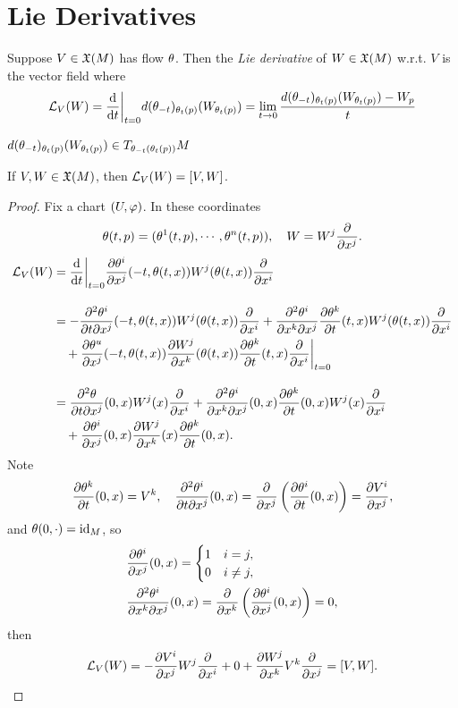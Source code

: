 \section{Lie Derivatives}
\begin{definition}
    Suppose $V \in \frak{X}(M)$ has flow $\theta$. Then the \textit{Lie derivative} of $W \in \frak{X}(M)$ w.r.t. $V$ is the vector field where 
    $$\mathcal{L}_V(W) = \dv{}{t}\bigg|_{t=0}d(\theta_{-t})_{\theta_t(p)}(W_{\theta_t(p)})
    = \lim_{t \to 0} \frac{d(\theta_{-t})_{\theta_t(p)}(W_{\theta_t(p)}) - W_p}{t}$$
\end{definition}
\begin{remark}
    $d(\theta_{-t})_{\theta_t(p)}(W_{\theta_t(p)}) \in T_{\theta_{-t}(\theta_t(p))} M$
\end{remark}
\begin{theorem}
    If $V,W \in \frak{X}(M)$, then $\mathcal{L}_V(W) = [V,W]$. 
\end{theorem}
\begin{proof}
    Fix a chart $(U,\varphi)$. In these coordinates 
    $$\theta(t,p) = (\theta^1(t,p), \cdots, \theta^n(t,p)), \quad 
    W = W^j \pdv{}{x^j}. $$
    \begin{align*}
    \mathcal{L}_V(W) &= \dv{}{t}\bigg|_{t=0} {\pdv{\theta^i}{x^j}}(-t, \theta(t,x)) W^j(\theta(t,x)) \pdv{}{x^i} \\[10pt]
    &= -{\pdv[2]{\theta^i}{t}{x^j}} (-t, \theta(t,x))W^j(\theta(t,x))\pdv{}{x^i} + \pdv[2]{\theta^i}{x^k}{x^j}(-t, \theta(t,x)) {\pdv{\theta^k}{t}}(t,x) W^j(\theta(t,x)) \pdv{}{x^i} \\
    &\quad+ {\pdv{\theta^u}{x^j}} (-t, \theta(t,x)) {\pdv{W^j}{x^k}} (\theta(t,x)) {\pdv{\theta^k}{t}} (t,x) \pdv{}{x^i} \bigg|_{t=0} \\[10pt]
    &= {\pdv[2]{\theta}{t}{x^j}} (0,x) W^j(x) \pdv{}{x^i} + {\pdv[2]{\theta^i}{x^k}{x^j}} (0,x) {\pdv{\theta^k}{t}} (0,x) W^j(x) \pdv{}{x^i} \\
    &\quad+ {\pdv{\theta^i}{x^j}}(0,x) {\pdv{W^j}{x^k}}(x) {\pdv{\theta^k}{t}}(0,x). 
    \end{align*}
    Note 
    $${\pdv{\theta^k}{t}}(0,x) = V^k, \quad {\pdv[2]{\theta^i}{t}{x^j}}(0,x) =  \pdv{}{x^j} \left({\pdv{\theta^i}{t}}(0,x)\right) = \pdv{V^i}{x^j}, $$
    and 
    $\theta(0,\cdot) = \mathrm{id}_M$, so 
    \begin{align*}
    &{\pdv{\theta^i}{x^j}}(0,x) = \begin{cases}
    1 & i = j, \\
    0 & i \neq j, \end{cases} \\
    &{\pdv[2]{\theta^i}{x^k}{x^j}} (0,x) = \pdv{}{x^k}\left( {\pdv{\theta^i}{x^j}}(0,x) \right) = 0,
    \end{align*}
    then 
    \begin{align*}
    \mathcal{L}_V(W) = -{\pdv{V^i}{x^j}}W^j\pdv{}{x^i} + 0 + \pdv{W^j}{x^k}V^k\pdv{}{x^j} = [V,W]. 
    \end{align*}
\end{proof}
